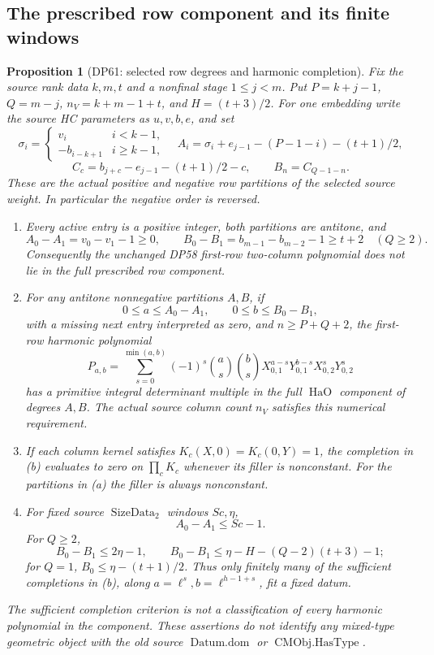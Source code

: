 \documentclass[11pt,a4paper]{article}
\newtheorem{proposition}[theorem]{Proposition}
\theoremstyle{definition}\newtheorem{remark}[theorem]{Remark}
\begin{document}
\subsection{The prescribed row component and its finite windows}

\begin{proposition}[DP61: selected row degrees and harmonic completion]\label{DP61}
Fix the source rank data $k,m,t$ and a nonfinal stage $1\le j<m$.
Put $P=k+j-1$, $Q=m-j$, $n_V=k+m-1+t$, and $H=(t+3)/2$.
For one embedding write the source HC parameters as $u,v,b,e$, and set
\[
 \sigma_i=\begin{cases}v_i&i<k-1,\\-b_{i-k+1}&i\ge k-1,\end{cases}
 \quad A_i=\sigma_i+e_{j-1}-(P-1-i)-(t+1)/2,
\]
\[
 C_c=b_{j+c}-e_{j-1}-(t+1)/2-c,\qquad B_n=C_{Q-1-n}.
\]
These are the actual positive and negative row partitions of the selected
source weight. In particular the negative order is reversed.
\begin{enumerate}[label=(\alph*),leftmargin=*]
\item Every active entry is a positive integer, both partitions are
antitone, and
\[
 A_0-A_1=v_0-v_1-1\ge0,
 \qquad B_0-B_1=b_{m-1}-b_{m-2}-1\ge t+2\quad(Q\ge2).
\]
Consequently the unchanged DP58 first-row two-column polynomial does not
lie in the full prescribed row component.
\item For any antitone nonnegative partitions $A,B$, if
\[
 0\le a\le A_0-A_1,\qquad 0\le b\le B_0-B_1,
\]
with a missing next entry interpreted as zero, and $n\ge P+Q+2$, the
first-row harmonic polynomial
\[
 P_{a,b}=\sum_{s=0}^{\min(a,b)}(-1)^s\binom as\binom bs
 X_{0,1}^{a-s}Y_{0,1}^{b-s}X_{0,2}^sY_{0,2}^s
\]
has a primitive integral determinant multiple in the full
$\operatorname{HaO}$ component of degrees $A,B$.
The actual source column count $n_V$ satisfies this numerical requirement.
\item If each column kernel satisfies $K_c(X,0)=K_c(0,Y)=1$, the
completion in (b) evaluates to zero on $\prod_cK_c$ whenever its
filler is nonconstant. For the partitions in (a) the filler is always
nonconstant.
\item For fixed source $\operatorname{SizeData}_2$ windows $Sc,\eta$,
\[
 A_0-A_1\le Sc-1.
\]
For $Q\ge2$,
\[
 B_0-B_1\le2\eta-1,
 \qquad B_0-B_1\le\eta-H-(Q-2)(t+3)-1;
\]
for $Q=1$, $B_0\le\eta-(t+1)/2$.
Thus only finitely many of the sufficient completions in (b), along
$a=\ell^s,b=\ell^{h-1+s}$, fit a fixed datum.
\end{enumerate}
The sufficient completion criterion is not a classification of every
harmonic polynomial in the component. These assertions do not identify
any mixed-type geometric object with the old source
$\operatorname{Datum.dom}$ or $\operatorname{CMObj.HasType}$.
\end{proposition}
\end{document}
